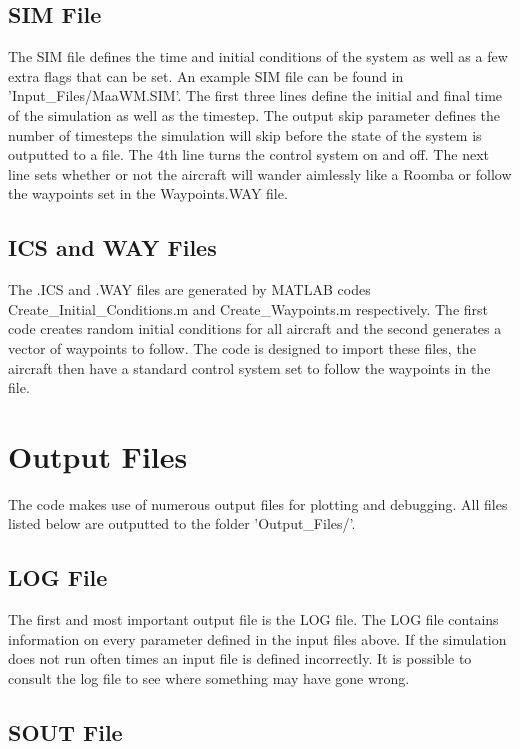 \documentclass[letterpaper]{article}
\begin{document}
\subsection{SIM File}

The SIM file defines the time and initial conditions of the system as
well as a few extra flags that can be set. An example SIM file can be
found in 'Input\_Files/MaaWM.SIM'. The first three lines define the
initial and final time of the simulation as well as the timestep. The
output skip parameter defines the number of timesteps the simulation
will skip before the state of the system is outputted to a file. The
4th line turns the control system on and off. The next line sets
whether or not the aircraft will wander aimlessly like a Roomba or
follow the waypoints set in the Waypoints.WAY file.

\subsection{ICS and WAY Files}

The .ICS and .WAY files are generated by MATLAB codes
Create\_Initial\_Conditions.m and Create\_Waypoints.m
respectively. The first code creates random initial conditions for all
aircraft and the second generates a vector of waypoints to
follow. The code is designed to import these files, the aircraft then
have a standard control system set to follow the waypoints in the file.

\section{Output Files}

The code makes use of numerous output files for plotting and
debugging. All files listed below are outputted to the
folder 'Output\_Files/'. 

\subsection{LOG File}

The first and most important output file is the LOG file. The LOG file
contains information on every parameter defined in the input files
above. If the simulation does not run often times an input file is
defined incorrectly. It is possible to consult the log file to see
where something may have gone wrong. 

\subsection{SOUT File}
\end{document}
